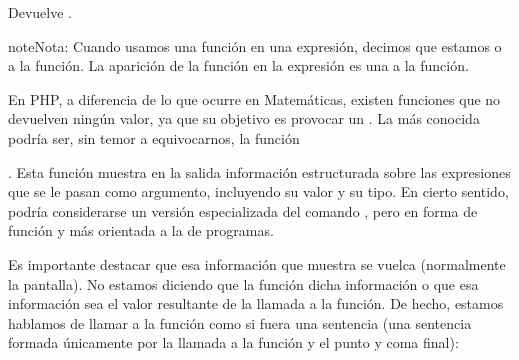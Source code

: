 \documentclass[a4paper,12pt,spanish]{sphinxmanual}
\begin{document}
%
\begin{sphinxVerbatim}[commandchars=\\\{\}]
   
\end{sphinxVerbatim}

Devuelve .

\begin{sphinxadmonition}{note}{Nota:}
Cuando usamos una función en una expresión, decimos que estamos  o
 a la función. La aparición de la función en la expresión es una
 a la función.
\end{sphinxadmonition}

\ignorespaces 
En PHP, a diferencia de lo que ocurre en Matemáticas, existen funciones que no
devuelven ningún valor, ya que su objetivo es provocar un . La
más conocida podría ser, sin temor a equivocarnos, la función %
\begin{footnote}[5]\sphinxAtStartFootnote
{}
%
\end{footnote}. Esta
función muestra en la salida información estructurada sobre las expresiones que
se le pasan como argumento, incluyendo su valor y su tipo. En cierto sentido,
podría considerarse un versión especializada del comando , pero en forma
de función y más orientada a la  de programas.

Es importante destacar que esa información que muestra se vuelca 
(normalmente la pantalla). No estamos diciendo que la función  dicha
información o que esa información sea el valor resultante de  la
llamada a la función. De hecho, estamos hablamos de llamar a la función como si
fuera una sentencia (una sentencia formada únicamente por la llamada a la
función y el punto y coma final):

%
\begin{sphinxVerbatim}[commandchars=\\\{\}]
  
\end{sphinxVerbatim}
\end{document}
